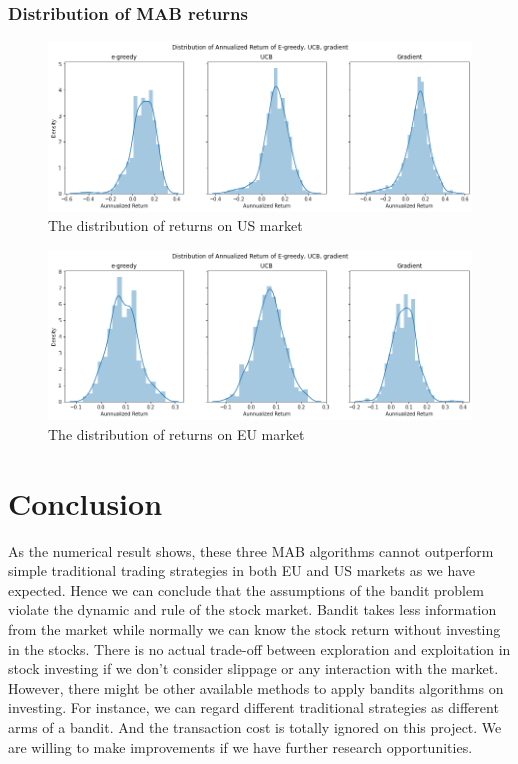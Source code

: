 \documentclass{article}
\begin{document}
\subsubsection{Distribution of MAB returns}
\begin{figure}[H]
\begin{center}
\includegraphics[width=.6\textwidth]{us}
\end{center}
\caption{The distribution of returns on US market}
\end{figure}


\begin{figure}[H]
\begin{center}
\includegraphics[width=.6\textwidth]{eu}
\end{center}
\caption{The distribution of returns on EU market}
\end{figure}

\section{Conclusion}
As the numerical result shows, these three MAB algorithms cannot outperform simple traditional trading strategies in both EU and US markets as we have expected. Hence we can conclude that the assumptions of the bandit problem violate the dynamic and rule of the stock market. Bandit takes less information from the market while normally we can know the stock return without investing in the stocks. There is no actual trade-off between exploration and exploitation in stock investing if we don’t consider slippage or any interaction with the market.
However, there might be other available methods to apply bandits algorithms on investing. For instance, we can regard different traditional strategies as different arms of a bandit. And the transaction cost is totally ignored on this project. We are willing to make improvements if we have further research opportunities.
\end{document}
